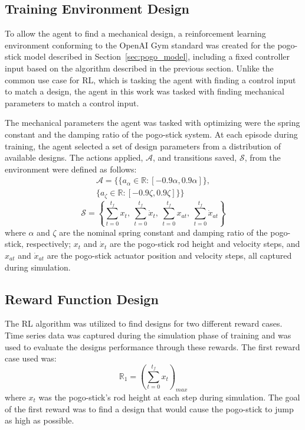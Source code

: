 \documentclass[letterpaper, 10 pt, conference]{ieeeconf}  %
\begin{document}
\subsection{Training Environment Design}
%
To allow the agent to find a mechanical design, a reinforcement learning environment conforming to the OpenAI Gym standard \cite{Brockman2016c} was created for the pogo-stick model described in Section~\ref{sec:pogo_model}, including a fixed controller input based on the algorithm described in the previous section. Unlike the common use case for RL, which is tasking the agent with finding a control input to match a design, the agent in this work was tasked with finding mechanical parameters to match a control input.

The mechanical parameters the agent was tasked with optimizing were the spring constant and the damping ratio of the pogo-stick system. At each episode during training, the agent selected a set of design parameters from a distribution of available designs. The actions applied, $\mathcal{A}$, and transitions saved, $\mathcal{S}$, from the environment were defined as follows:
%
\begin{equation}
        \label{eq:action}
        \begin{aligned}
        \mathcal{A} = \{ \{ a_{\alpha} \in \mathbb{R}: [-0.9 \alpha, 0.9 \alpha] \}, \\ 
        \{ a_{\zeta} \in \mathbb{R}: [-0.9 \zeta, 0.9 \zeta] \} \}
        \end{aligned}
\end{equation} 
%
\begin{equation}
        \label{eq:transitions}
        \mathcal{S}= \left \{\sum_{t=0}^{t_f}x_t,~ \sum_{t=0}^{t_f}\dot{x}_t,~ \sum_{t=0}^{t_f}x_{at},~ \sum_{t=0}^{t_f}\dot{x}_{at} \right \}
\end{equation}
%
where $\alpha$ and $\zeta$ are the nominal spring constant and damping ratio of the pogo-stick, respectively; $x_t$ and $\dot{x}_t$ are the pogo-stick rod height and velocity steps, and $x_{at}$ and $\dot{x}_{at}$ are the pogo-stick actuator position and velocity steps, all captured during simulation. 

\subsection{Reward Function Design}

The RL algorithm was utilized to find designs for two different reward cases. Time series data was captured during the simulation phase of training and was used to evaluate the designs performance through these rewards. The first reward case used was:
%
\begin{equation}
        \mathbb{R}_1 = \left (\sum_{t=0}^{t_f}x_t  \right )_{max}
\end{equation}
% 
where $x_t$ was the pogo-stick's rod height at each step during simulation. The goal of the first reward was to find a design that would cause the pogo-stick to jump as high as possible. 
\end{document}
